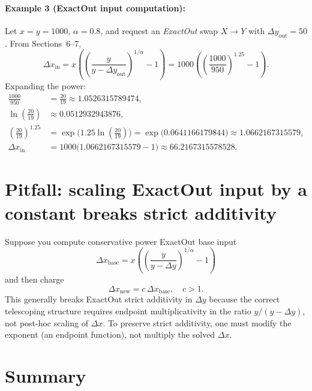 \documentclass[11pt]{article}
\theoremstyle{definition}
\theoremstyle{remark}
\newcommand{\dx}{\Delta x}
\newcommand{\dy}{\Delta y}
\begin{document}
\paragraph{Example 3 (ExactOut input computation):} Let \(x=y=1000\), \(\alpha=0.8\), and request an \emph{ExactOut} swap \(X\to Y\) with \(\dy_{\mathrm{out}}=50\).
From Sections~6--7,
\[
\dx_{\mathrm{in}} = x\left(\left(\frac{y}{y-\dy_{\mathrm{out}}}\right)^{1/\alpha}-1\right)
= 1000\left(\left(\frac{1000}{950}\right)^{1.25}-1\right).
\]
Expanding the power:
\begin{align*}
\frac{1000}{950} &= \frac{20}{19} \approx 1.0526315789474,\\
\ln\!\left(\tfrac{20}{19}\right) &\approx 0.0512932943876,\\
\left(\tfrac{20}{19}\right)^{1.25} &= \exp\!\Big(1.25\ln\!\left(\tfrac{20}{19}\right)\Big)
= \exp\!\big(0.0641166179844\big)\approx 1.0662167315579,\\
\dx_{\mathrm{in}} &= 1000\big(1.0662167315579-1\big)\approx 66.2167315578528.
\end{align*}
\section{Pitfall: scaling ExactOut input by a constant breaks strict additivity}

Suppose you compute conservative power ExactOut base input
\[
\dx_{\mathrm{base}}=x\left(\left(\frac{y}{y-\dy}\right)^{1/\alpha}-1\right)
\]
and then charge
\[
\dx_{\mathrm{new}} = c\,\dx_{\mathrm{base}},\quad c>1.
\]
This generally breaks ExactOut strict additivity in $\dy$ because the correct telescoping structure requires endpoint multiplicativity in the ratio $y/(y-\dy)$, not post-hoc scaling of $\dx$.
To preserve strict additivity, one must modify the exponent (an endpoint function), not multiply the solved $\dx$.

\section{Summary}
\end{document}
